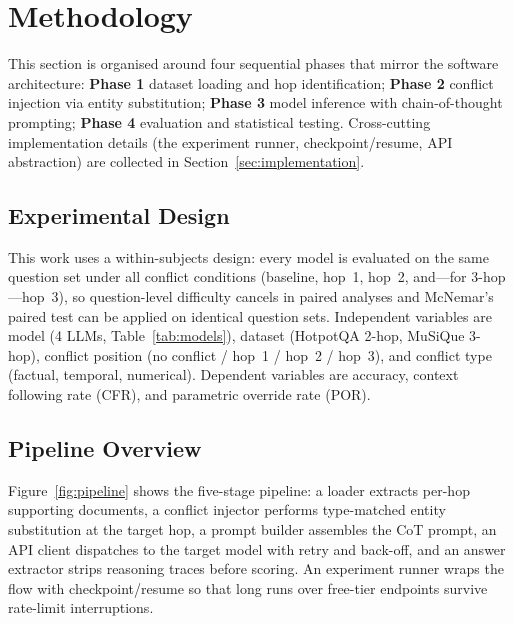 \section{Methodology}
\label{sec:methodology}

This section is organised around four sequential phases that mirror the software architecture: \textbf{Phase 1} dataset loading and hop identification; \textbf{Phase 2} conflict injection via entity substitution; \textbf{Phase 3} model inference with chain-of-thought prompting; \textbf{Phase 4} evaluation and statistical testing. Cross-cutting implementation details (the experiment runner, checkpoint/resume, API abstraction) are collected in Section~\ref{sec:implementation}.

\subsection{Experimental Design}
\label{sec:design}

This work uses a within-subjects design: every model is evaluated on the same question set under all conflict conditions (baseline, hop~1, hop~2, and---for 3-hop---hop~3), so question-level difficulty cancels in paired analyses and McNemar's paired test can be applied on identical question sets. Independent variables are model (4 LLMs, Table~\ref{tab:models}), dataset (HotpotQA 2-hop, MuSiQue 3-hop), conflict position (no conflict / hop~1 / hop~2 / hop~3), and conflict type (factual, temporal, numerical). Dependent variables are accuracy, context following rate (CFR), and parametric override rate (POR).

\subsection{Pipeline Overview}
\label{sec:pipeline}

Figure~\ref{fig:pipeline} shows the five-stage pipeline: a loader extracts per-hop supporting documents, a conflict injector performs type-matched entity substitution at the target hop, a prompt builder assembles the CoT prompt, an API client dispatches to the target model with retry and back-off, and an answer extractor strips reasoning traces before scoring. An experiment runner wraps the flow with checkpoint/resume so that long runs over free-tier endpoints survive rate-limit interruptions.

